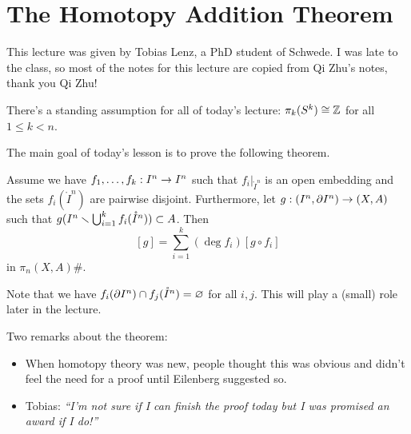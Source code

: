 
\section{The Homotopy Addition Theorem}


This lecture was given by Tobias Lenz, a PhD student of Schwede. I was late to the class, so most of the notes for this lecture are copied from Qi Zhu's notes, thank you Qi Zhu!

\begin{remark}
There's a standing assumption for all of today's lecture: $\pi_k(S^k)\cong{\mathbb Z}$ for all $1\leq k<n$.
\end{remark}

The main goal of today's lesson is to prove the following theorem.

\begin{theorem}\label{theorem:HAT}
Assume we have ${{f}_1,\dots,{f}_{k}}:I^n\to I^n$ such that $f_i|_{\ring I^n}$ is an open embedding and the sets $f_i(\ring I^n)$ are pairwise disjoint. Furthermore, let $g:(I^n,\partial I^n)\to (X,A)$ such that $g(I^n\smallsetminus\bigcup_{i=1}^k f_i(\mathring I^n))\subset A$. Then
\[[g]=\sum_{i=1}^k(\deg f_i)[g\circ f_i]\]
in $\pi_n(X,A)\#$.
\end{theorem}

\begin{remark}
Note that we have $f_i(\partial I^n)\cap f_j(\mathring I^n)=\varnothing$ for all $i,j$. This will play a (small) role later in the lecture.
\end{remark}

\begin{remark}
Two remarks about the theorem:
\begin{itemize}
    \item When homotopy theory was new, people thought this was obvious and didn't feel the need for a proof until Eilenberg suggested so.
    \item Tobias: \emph{\enquote{I'm not sure if I can finish the proof today but I was promised an award if I do!}}
\end{itemize}
\end{remark}

